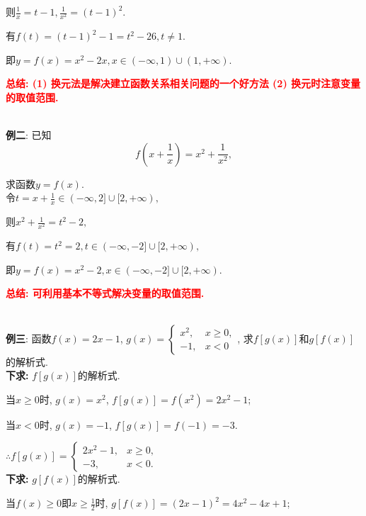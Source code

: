 \documentclass[8pt]{article}
\begin{document}
					则$\displaystyle \frac{1}{x}=t-1, \frac{1}{x^2}=(t-1)^2.$

					有$\displaystyle f(t)=(t-1)^2-1=t^2-26, t\neq 1.$

					即$\displaystyle y=f(x)=x^2-2x, x\in(-\infty, 1)\cup(1, +\infty).$

					\textbf{\textcolor{red}{总结: (1) 换元法是解决建立函数关系相关问题的一个好方法 (2) 换元时注意变量的取值范围.}}

				~\\

				\textbf{例二}: 已知$$f\left(x+\frac{1}{x}\right)=x^2+\frac{1}{x^2},$$

					求函数$y=f(x)$.
					~\\

					令$\displaystyle t=x+\frac{1}{x}\in(-\infty, 2]\cup[2, +\infty),$

					则$\displaystyle x^2+\frac{1}{x^2}=t^2-2,$

					有$\displaystyle f(t)=t^2=2, t\in(-\infty, -2]\cup[2, +\infty),$

					即$\displaystyle y=f(x)=x^2-2, x\in(-\infty, -2]\cup[2, +\infty).$

					\textbf{\textcolor{red}{总结: 可利用基本不等式解决变量的取值范围.}}

				~\\

				\textbf{例三}: 函数$f(x)=2x-1$, $\displaystyle g(x)=\left\{\begin{array}{rl}x^2,&x\geq 0,\\-1,&x<0\end{array}\right.$, 求$f[g(x)]$和$g[f(x)]$的解析式.
					~\\

					\textbf{下求:} $f[g(x)]$的解析式.

					当$x\geq 0$时, $g(x)=x^2$, $f[g(x)]=f(x^2)=2x^2-1$;

					当$x< 0$时, $g(x)=-1$, $f[g(x)]=f(-1)=-3$.

					$\displaystyle \therefore f[g(x)]=\left\{\begin{array}{rl}2x^2-1,&x\geq 0,\\-3,&x<0.\end{array}\right.$
					~\\

					\textbf{下求:} $g[f(x)]$的解析式.

					当$f(x)\geq 0$即$\displaystyle x\geq \frac{1}{2}$时, $g[f(x)]=(2x-1)^2=4x^2-4x+1$;
					~\\
\end{document}
